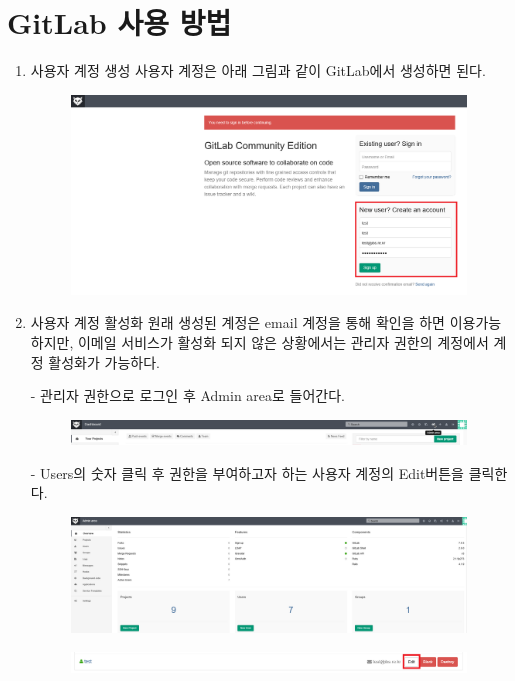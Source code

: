 \documentclass[11pt
  , a4paper
  , article
  , oneside
]{memoir}
\begin{document}
\clearpage

\chapter{GitLab 사용 방법}
\begin{enumerate}
\item{사용자 계정 생성}
사용자 계정은 아래 그림과 같이 GitLab에서 생성하면 된다.
\begin{figure}[h!]
	\centering
	\includegraphics[width=0.99\textwidth]{./images/15.PNG}
\end{figure}

\item{사용자 계정 활성화}
원래 생성된 계정은 email 계정을 통해 확인을 하면 이용가능하지만, 이메일 서비스가 활성화 되지 않은 상황에서는 관리자 권한의 계정에서 계정 활성화가 가능하다.

- 관리자 권한으로 로그인 후 Admin area로 들어간다.
\begin{figure}[h!]
	\centering
	\includegraphics[width=0.99\textwidth]{./images/14.png}
\end{figure}

- Users의 숫자 클릭 후 권한을 부여하고자 하는 사용자 계정의 Edit버튼을 클릭한다.

\begin{figure}[h!]
	\centering
	\includegraphics[width=0.99\textwidth]{./images/19.PNG}
\end{figure}
\begin{figure}[h!]
	\centering
	\includegraphics[width=0.99\textwidth]{./images/17.PNG}
\end{figure}


\end{enumerate}
\end{document}
